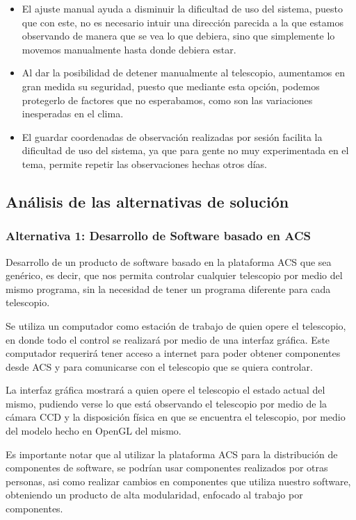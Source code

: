 \documentclass[letterpaper,titlepage,spanish,10pt]{article}
\begin{document}
\begin{itemize}
	\item El ajuste manual ayuda a disminuir la dificultad de uso del sistema, 
puesto que con este, no es necesario intuir una direcci\'on parecida a la que 
estamos observando de manera que se vea lo que debiera, sino que simplemente 
lo movemos manualmente hasta donde debiera estar.

	\item Al dar la posibilidad de detener manualmente al telescopio, aumentamos 
en gran medida su seguridad, puesto que mediante esta opci\'on, podemos protegerlo 
de factores que no esperabamos, como son las variaciones inesperadas en el clima. 

	\item El guardar coordenadas de observaci\'on realizadas por sesi\'on facilita 
la dificultad de uso del sistema, ya que para gente no muy experimentada en el tema, 
permite repetir las observaciones hechas otros d\'ias.

	\end{itemize}


\subsection{An\'alisis de las alternativas de soluci\'on}
\subsubsection{Alternativa 1: Desarrollo de Software basado en ACS} %
Desarrollo de un producto de software basado en la plataforma ACS que sea gen\'erico,
es decir, que nos permita controlar cualquier telescopio por medio del mismo
programa, sin la necesidad de tener un programa diferente para cada telescopio.

Se utiliza un computador como estaci\'on de trabajo de quien opere el telescopio, 
en donde todo el control se realizar\'a por medio de una interfaz gr\'afica. Este
computador requerir\'a tener acceso a internet para poder obtener componentes desde
ACS y para comunicarse con el telescopio que se quiera controlar.

La interfaz gr\'afica mostrar\'a a quien opere el telescopio el estado actual del
mismo, pudiendo verse lo que est\'a observando el telescopio por medio de la
c\'amara CCD y la disposici\'on f\'isica en que se encuentra el telescopio, por medio
del modelo hecho en OpenGL del mismo.

Es importante notar que al utilizar la plataforma ACS para la distribuci\'on de 
componentes de software, se podr\'ian usar componentes realizados por otras personas, 
asi como realizar cambios en componentes que utiliza nuestro software, obteniendo un
producto de alta modularidad, enfocado al trabajo por componentes.
\end{document}
